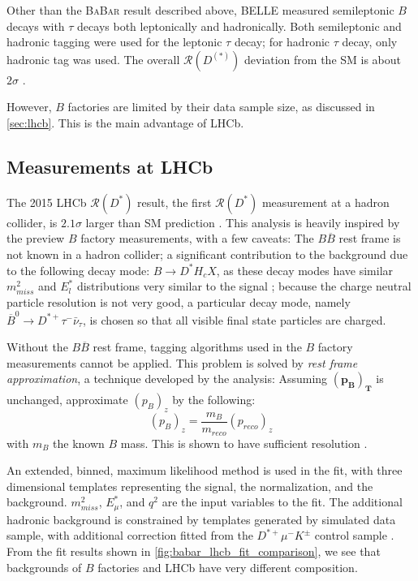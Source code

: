 \documentclass[12pt,letterpaper]{article}
\renewcommand{\vec}[1]{\mathbf{#1}}                   %
\def\BaBar/{\textsc{BaBar}}
\def\RDst/{\ensuremath{\mathcal{R}(D^{*})}}
\def\RDDst/{\ensuremath{\mathcal{R}(D^{(*)})}}
\begin{document}
Other than the \BaBar/ result described above,
BELLE measured semileptonic $B$ decays with $\tau$ decays both
leptonically and hadronically.
Both semileptonic and hadronic tagging were used for the leptonic $\tau$ decay;
for hadronic $\tau$ decay, only hadronic tag was used.
The overall \RDDst/ deviation from the SM is about
$2\sigma$ \cite{Hirose:2017185}.

However, $B$ factories are limited by their data sample size, as discussed
in \autoref{sec:lhcb}.
This is the main advantage of LHCb.

\subsection{Measurements at LHCb} \label{sec:meas_lhcb}
The 2015 LHCb \RDst/ result, the first \RDst/ measurement at a hadron collider,
is $2.1\sigma$ larger than SM prediction \cite{LHCb:PhysRevLett.115.111803}.
This analysis is heavily inspired by the preview $B$ factory measurements, with
a few caveats:
The $B \overline{B}$ rest frame is not known in a hadron collider;
a significant contribution to the background due to the following decay mode:
$B \rightarrow D^* H_c X$, as these decay modes have similar $m^2_{miss}$ and
$E^{*}_l$ distributions very similar to the signal \cite{Ciezarek:2017yzh};
because the charge neutral particle resolution is not very good, a particular
decay mode, namely $\overline{B}^0 \rightarrow D^{*+} \tau^- \bar{\nu}_\tau$, is
chosen so that all visible final state particles are charged.

Without the $B \overline{B}$ rest frame, tagging algorithms used in the $B$
factory measurements cannot be applied.
This problem is solved by \emph{rest frame approximation}, a technique developed
by the analysis:
Assuming $\vec{(p_{B})_T}$ is unchanged, approximate $(p_{B})_z$ by the
following:
\begin{equation}
    (p_{B})_z = \frac{m_B}{m_{reco}} (p_{reco})_z
\end{equation}
with $m_B$ the known $B$ mass.
This is shown to have sufficient resolution \cite{LHCb:PhysRevLett.115.111803}.

An extended, binned, maximum likelihood method is used in the fit, with three dimensional templates representing the signal, the normalization, and the background.
$m^2_{miss}$, $E^*_\mu$, and $q^2$ are the input variables to the fit.
The additional hadronic background is constrained by templates generated by
simulated data sample, with additional correction fitted from the
$D^{*+} \mu^- K^{\pm}$ control sample \cite{LHCb:PhysRevLett.115.111803}.
From the fit results shown in \autoref{fig:babar_lhcb_fit_comparison}, we see that backgrounds of $B$
factories and LHCb have very different composition.
\end{document}
